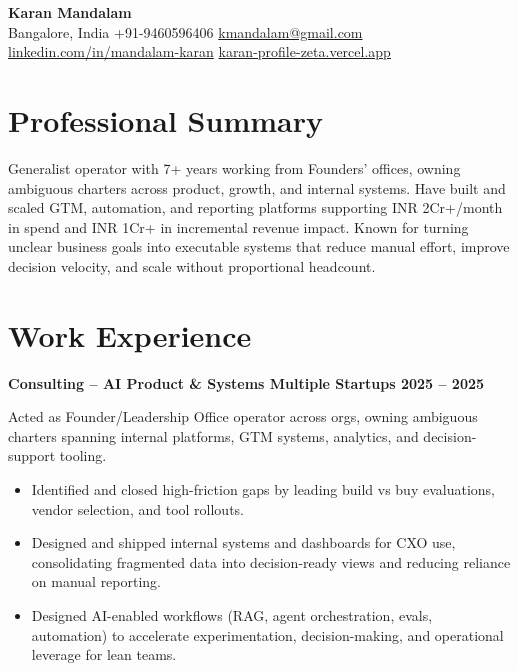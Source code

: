 \documentclass[10pt,a4paper]{article}
\begin{document}
\fontsize{10pt}{11.2pt}\selectfont

\begin{center}
{\LARGE \textbf{Karan Mandalam}} \\[4pt]
Bangalore, India \textbar{} +91-9460596406 \textbar{} \href{mailto:kmandalam@gmail.com}{kmandalam@gmail.com} \\
\href{https://linkedin.com/in/mandalam-karan}{linkedin.com/in/mandalam-karan} \textbar{} \href{https://karan-profile-zeta.vercel.app}{karan-profile-zeta.vercel.app}
\end{center}

\section*{Professional Summary}
Generalist operator with 7+ years working from Founders' offices, owning ambiguous charters across product, growth, and internal systems. Have built and scaled GTM, automation, and reporting platforms supporting INR 2Cr+/month in spend and INR 1Cr+ in incremental revenue impact. Known for turning unclear business goals into executable systems that reduce manual effort, improve decision velocity, and scale without proportional headcount.

\section*{Work Experience}

\textbf{Consulting -- AI Product \& Systems \textbar{} Multiple Startups \textbar{} 2025 -- 2025}

Acted as Founder/Leadership Office operator across orgs, owning ambiguous charters spanning internal platforms, GTM systems, analytics, and decision-support tooling.
\begin{itemize}
  \item Identified and closed high-friction gaps by leading build vs buy evaluations, vendor selection, and tool rollouts.
  \item Designed and shipped internal systems and dashboards for CXO use, consolidating fragmented data into decision-ready views and reducing reliance on manual reporting.
  \item Designed AI-enabled workflows (RAG, agent orchestration, evals, automation) to accelerate experimentation, decision-making, and operational leverage for lean teams.
\end{itemize}
\end{document}
